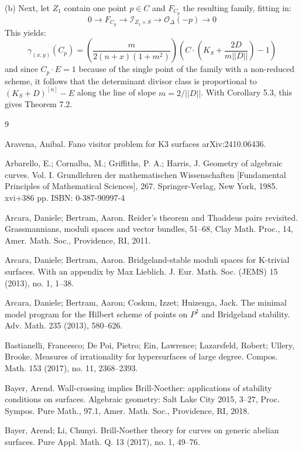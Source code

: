 \documentclass{amsart}
\begin{document}
(b) Next, let $Z_1$ contain one point $p\in C$ and $F_{C_p}$ the resulting family, fitting in: 
\[ 0 \rightarrow F_{C_p} \rightarrow {\mathcal I}_{Z_1 \times S} \rightarrow {\mathcal O}_\Delta(-p) \rightarrow 0 \] 
This yields: 
\[ \gamma_{(x,y)}(C_p) = \left(\frac{m}{2(n+x)(1 + m^2)}\right) \left( C \cdot (K_S + \frac{2D}{m||D||})   - 1 \right) \] 
and since $C_p \cdot E = 1$ because of the single point of the family with a non-reduced scheme, it follows that the determinant divisor class is proportional to
$( K_S + D) ^{[n]} - E$ 
along the line of slope $m = 2/||D||$. With Corollary 5.3, this gives Theorem 7.2.


\begin{thebibliography}{9}

 Aravena, Anibal. Fano visitor problem for K3 surfaces arXiv:2410.06436.

 Arbarello, E.; Cornalba, M.; Griffiths, P. A.; Harris, J. Geometry of algebraic curves. Vol. I. Grundlehren der mathematischen Wissenschaften [Fundamental Principles of Mathematical Sciences], 267. Springer-Verlag, New York, 1985. xvi+386 pp. ISBN: 0-387-90997-4 


 Arcara, Daniele; Bertram, Aaron. Reider's theorem and Thaddeus pairs revisited. Grassmannians, moduli spaces and vector bundles, 51–68, Clay Math. Proc., 14, Amer. Math. Soc., Providence, RI, 2011.

 Arcara, Daniele; Bertram, Aaron. Bridgeland-stable moduli spaces for K-trivial surfaces. With an appendix by Max Lieblich. J. Eur. Math. Soc. (JEMS) 15 (2013), no. 1, 1–38.

 Arcara, Daniele; Bertram, Aaron; Coskun, Izzet; Huizenga, Jack. The minimal model program for the Hilbert scheme of points on $P^2$ and Bridgeland stability. Adv. Math. 235 (2013), 580–626.

 Bastianelli, Francesco; De Poi, Pietro; Ein, Lawrence; Lazarsfeld, Robert; Ullery, Brooke. Measures of irrationality for hypersurfaces of large degree. Compos. Math. 153 (2017), no. 11, 2368–2393.

 Bayer, Arend.  Wall-crossing implies Brill-Noether: applications of stability conditions on surfaces. Algebraic geometry: Salt Lake City 2015, 3–27, Proc. Sympos. Pure Math., 97.1, Amer. Math. Soc., Providence, RI, 2018. 



 Bayer, Arend; Li, Chunyi. Brill-Noether theory for curves on generic abelian surfaces. Pure Appl. Math. Q. 13 (2017), no. 1, 49–76.


\end{thebibliography}
\end{document}
